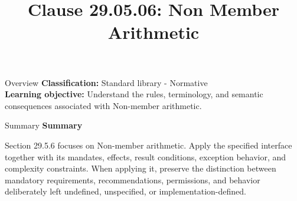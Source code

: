 \documentclass[10pt,letterpaper]{article}
\title{Clause 29.05.06: Non Member Arithmetic}
\author{}
\date{}
\begin{document}
\maketitle
\begin{CornellOverviewBox}{Overview}
\textbf{Classification:} Standard library - Normative\\[2pt]
\textbf{Learning objective:} Understand the rules, terminology, and semantic consequences associated with Non-member arithmetic.
\end{CornellOverviewBox}\begin{CornellSummaryBox}{Summary}
{\sffamily\bfseries\color{Accent} Summary}\par\vspace{3pt}Section 29.5.6 focuses on Non-member arithmetic. Apply the specified interface together with its mandates, effects, result conditions, exception behavior, and complexity constraints. When applying it, preserve the distinction between mandatory requirements, recommendations, permissions, and behavior deliberately left undefined, unspecified, or implementation-defined.
\end{CornellSummaryBox}
\end{document}
